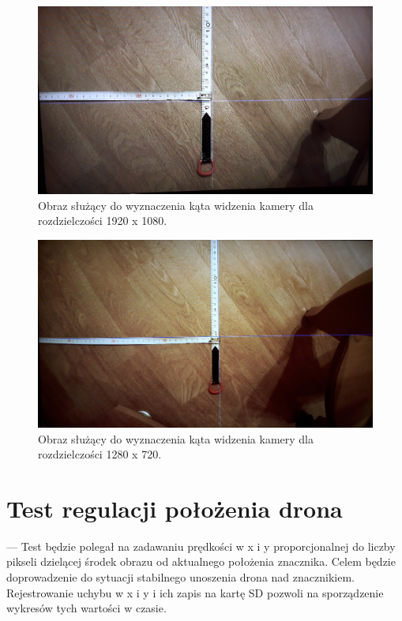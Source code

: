 \begin{figure}[h]
	\centering
	\includegraphics[width=\textwidth]{1080p.jpg}
	\caption{Obraz służący do wyznaczenia kąta widzenia kamery dla rozdzielczości 1920 x 1080.}
	\label{fig:1080p}
\end{figure}
\begin{figure}[h]
	\centering
	\includegraphics[width=\textwidth]{720p.jpg}
	\caption{Obraz służący do wyznaczenia kąta widzenia kamery dla rozdzielczości 1280 x 720.}
	\label{fig:720p}
\end{figure}

\fi

\section{Test regulacji położenia drona}
\label{sec:test_regulacji_polozenia_drona}
--- Test będzie polegał na zadawaniu prędkości w x i y proporcjonalnej do liczby pikseli dzielącej środek obrazu od aktualnego położenia znacznika. 
Celem będzie doprowadzenie do sytuacji stabilnego unoszenia drona nad znacznikiem. 
Rejestrowanie uchybu w x i y i ich zapis na kartę SD pozwoli na sporządzenie wykresów tych wartości w czasie.

